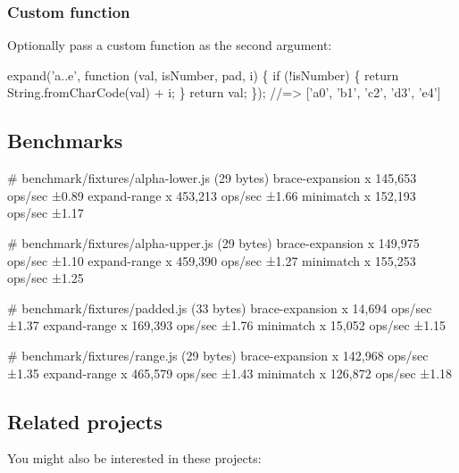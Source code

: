 \subsubsection*{Custom function}

Optionally pass a custom function as the second argument\+:


\begin{DoxyCode}
expand('a..e', function (val, isNumber, pad, i) \{
  if (!isNumber) \{
    return String.fromCharCode(val) + i;
  \}
  return val;
\});
//=> ['a0', 'b1', 'c2', 'd3', 'e4']
\end{DoxyCode}


\subsection*{Benchmarks}


\begin{DoxyCode}
# benchmark/fixtures/alpha-lower.js (29 bytes)
  brace-expansion x 145,653 ops/sec ±0.89%
  expand-range x 453,213 ops/sec ±1.66%
  minimatch x 152,193 ops/sec ±1.17%

# benchmark/fixtures/alpha-upper.js (29 bytes)
  brace-expansion x 149,975 ops/sec ±1.10%
  expand-range x 459,390 ops/sec ±1.27%
  minimatch x 155,253 ops/sec ±1.25%

# benchmark/fixtures/padded.js (33 bytes)
  brace-expansion x 14,694 ops/sec ±1.37%
  expand-range x 169,393 ops/sec ±1.76%
  minimatch x 15,052 ops/sec ±1.15%

# benchmark/fixtures/range.js (29 bytes)
  brace-expansion x 142,968 ops/sec ±1.35%
  expand-range x 465,579 ops/sec ±1.43%
  minimatch x 126,872 ops/sec ±1.18%
\end{DoxyCode}


\subsection*{Related projects}

You might also be interested in these projects\+:


